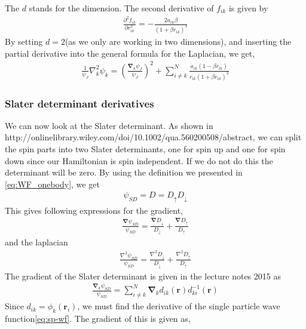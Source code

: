 \documentclass[11pt]{article}
\newcommand{\husk}[1]{\color{red} #1 \color{black}}
\begin{document}
The $d$ stands for the dimension. The second derivative of $f_{ik}$ is given by
\begin{align}
	\frac{\partial^2f_{ik}}{\partial r_{ik}^2} = -\frac{2a_{ik}\beta}{(1 + \beta r_{ik})^3}
	\label{eq:jastrow-f-second-derivative}
\end{align}
By setting $d=2$(as we only are working in two dimensions), and inserting the partial derivative into the general formula for the Laplacian, we get,
\begin{align}
	\frac{1}{\psi_J}\nabla_k^2 \psi_k = \left( \frac{\bm{\nabla}_k \psi_J}{\psi_J} \right)^2 + \sum_{i\neq k}^N \frac{a_{ik}(1-\beta r_{ik})}{r_{ik}(1+\beta r_{ik})^3}
	\label{eq:n-body-jastrow-lap}
\end{align}

\subsubsection{Slater determinant derivatives}
We can now look at the Slater determinant. As shown in http://onlinelibrary.wiley.com/doi/10.1002/qua.560200508/abstract, we can split the spin parts into two Slater determinants, one for spin up and one for spin down since our Hamiltonian is spin independent. If we do not do this the determinant will be zero. By using the definition we presented in \eqref{eq:WF_onebody}, we get
\begin{align}
	\psi_{SD} = D = D_{\uparrow}D_{\downarrow}
	\label{eq:slater-det-spin-up-down}
\end{align}
This gives following expressions for the gradient,
\begin{align}
	\frac{\bm{\nabla}\psi_{SD}}{\psi_{SD}} = \frac{\bm{\nabla}D_{\downarrow}}{D_{\downarrow}} + \frac{\bm{\nabla}D_{\uparrow}}{D_{\uparrow}}
	\label{eq:slater-gradient-spin-down-up-grad}
\end{align}
and the laplacian
\begin{align}
	\frac{{\nabla}^2\psi_{SD}}{\psi_{SD}} = \frac{{\nabla}^2D_{\downarrow}}{D_{\downarrow}} + \frac{{\nabla}^2D_{\uparrow}}{D_{\uparrow}}
	\label{eq:slater-laplacian-spin-down-up-lap}
\end{align}
The gradient of the Slater determinant is given in the \husk{lecture notes 2015} as
\begin{align}
	\frac{\bm{\nabla}_k\psi_{SD}}{\psi_{SD}} = \sum_{i\neq k}^N\bm{\nabla}_k d_{ik}(\mathbf{r})d_{ki}^{-1}(\mathbf{r})
	\label{eq:gradient-slater}
\end{align}
Since $d_{ik}=\phi_k (\mathbf{r}_i)$, we must find the derivative of the single particle wave function\eqref{eq:sp-wf}. The gradient of this is given as,
\end{document}
